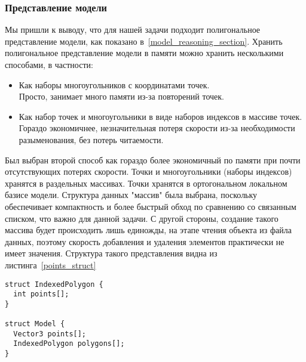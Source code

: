 \documentclass[a4paper,12pt]{report}
\numberwithin{equation}{section}
\begin{document}
\subsubsection{Представление модели}
Мы пришли к выводу, что для нашей задачи подходит полигональное представление модели, как показано в~\ref{model_reasoning_section}. Хранить полигональное представление модели в памяти можно хранить несколькими способами, в частности:
\begin{itemize}
\item Как наборы многоугольников с координатами точек. \\
Просто, занимает много памяти из-за повторений точек.
\item Как набор точек и многоугольники в виде наборов индексов в массиве точек. \\
Гораздо экономичнее, незначительная потеря скорости из-за необходимости разыменования, без потерь читаемости.
\end{itemize}
Был выбран второй способ как гораздо более экономичный по памяти при почти отсутствующих потерях скорости. Точки и многоугольники (наборы индексов) хранятся в раздельных массивах. Точки хранятся в ортогональном локальном базисе модели. Структура данных "массив" была выбрана, поскольку обеспечивает компактность и более быстрый обход по сравнению со связанным списком, что важно для данной задачи. С другой стороны, создание такого массива будет происходить лишь единожды, на этапе чтения объекта из файла данных, поэтому скорость добавления и удаления элементов практически не имеет значения. Структура такого представления видна из листинга~\ref{points_struct}

\begin{lstlisting}[float=h,caption={Структуры данных ``Модель'' и ``Полигон''},label=points_struct]
struct IndexedPolygon {
  int points[];
}

struct Model {
  Vector3 points[];
  IndexedPolygon polygons[];
}
\end{lstlisting}
\end{document}
